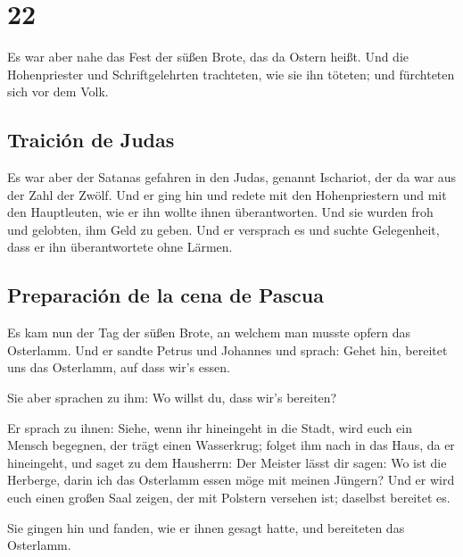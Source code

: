 \hypertarget{section-21}{%
\section{22}\label{section-21}}

 Es war aber nahe das Fest der süßen Brote, das da Ostern
heißt.  Und die Hohenpriester und Schriftgelehrten
trachteten, wie sie ihn töteten; und fürchteten sich vor dem Volk.

\hypertarget{traiciuxf3n-de-judas}{%
\subsection{Traición de Judas}\label{traiciuxf3n-de-judas}}

 Es war aber der Satanas gefahren in den Judas, genannt
Ischariot, der da war aus der Zahl der Zwölf.  Und er ging
hin und redete mit den Hohenpriestern und mit den Hauptleuten, wie er
ihn wollte ihnen überantworten.  Und sie wurden froh und
gelobten, ihm Geld zu geben.  Und er versprach es und
suchte Gelegenheit, dass er ihn überantwortete ohne Lärmen.

\hypertarget{preparaciuxf3n-de-la-cena-de-pascua}{%
\subsection{Preparación de la cena de
Pascua}\label{preparaciuxf3n-de-la-cena-de-pascua}}

 Es kam nun der Tag der süßen Brote, an welchem man musste
opfern das Osterlamm.  Und er sandte Petrus und Johannes
und sprach: Gehet hin, bereitet uns das Osterlamm, auf dass wir's essen.

 Sie aber sprachen zu ihm: Wo willst du, dass wir's
bereiten?

 Er sprach zu ihnen: Siehe, wenn ihr hineingeht in die
Stadt, wird euch ein Mensch begegnen, der trägt einen Wasserkrug; folget
ihm nach in das Haus, da er hineingeht,  und saget zu dem
Hausherrn: Der Meister lässt dir sagen: Wo ist die Herberge, darin ich
das Osterlamm essen möge mit meinen Jüngern?  Und er wird
euch einen großen Saal zeigen, der mit Polstern versehen ist; daselbst
bereitet es.

 Sie gingen hin und fanden, wie er ihnen gesagt hatte,
und bereiteten das Osterlamm.

